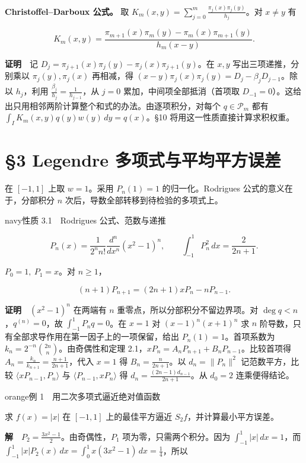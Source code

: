 \documentclass[11pt,a4paper]{article}
\newcommand{\lectureheading}[1]{\section{#1}}
\begin{document}
\textbf{Christoffel--Darboux 公式。} 取 \(K_m(x,y)=\sum_{j=0}^m\frac{\pi_j(x)\pi_j(y)}{h_j}\)。对 \(x\ne y\) 有

\[
K_m(x,y)=\frac{\pi_{m+1}(x)\pi_m(y)-\pi_m(x)\pi_{m+1}(y)}
{h_m(x-y)} .
\]

\textbf{证明}　记 \(D_j=\pi_{j+1}(x)\pi_j(y)-\pi_j(x)\pi_{j+1}(y)\)。在 \(x,y\) 写出三项递推，分别乘以 \(\pi_j(y),\pi_j(x)\) 再相减，得 \((x-y)\pi_j(x)\pi_j(y)=D_j-\beta_jD_{j-1}\)。除以 \(h_j\)，利用 \(\frac{\beta_j}{h_j}=\frac{1}{h_{j-1}}\)，从 \(j=0\) 累加，中间项全部抵消（首项取 \(D_{-1}=0\)）。这给出只用相邻两阶计算整个和式的办法。由逐项积分，对每个 \(q\in\mathcal P_m\) 都有 \(\int_I K_m(x,y)q(y)w(y)\,dy=q(x)\)。§10 将用这一性质直接计算求积权重。

\clearpage\lectureheading{§3 Legendre 多项式与平均平方误差}

在 \([-1,1]\) 上取 \(w=1\)。采用 \(P_n(1)=1\) 的归一化。Rodrigues 公式的意义在于，分部积分 \(n\) 次后，导数全部转移到待检验的多项式上。

\begin{sboxenv}{navy}{性质 3.1　Rodrigues 公式、范数与递推}

\[
P_n(x)=\frac{1}{2^n n!}\frac{d^n}{dx^n}(x^2-1)^n,\qquad
\int_{-1}^1 P_n^2\,dx=\frac{2}{2n+1}.
\]

\(P_0=1,\ P_1=x\)。对 \(n\ge1\)，

\[
(n+1)P_{n+1}=(2n+1)xP_n-nP_{n-1}.
\]

\end{sboxenv}

\textbf{证明}　\((x^2-1)^n\) 在两端有 \(n\) 重零点，所以分部积分不留边界项。对 \(\deg q<n\)，\(q^{(n)}=0\)，故 \(\int_{-1}^1 P_nq=0\)。在 \(x=1\) 对 \((x-1)^n(x+1)^n\) 求 \(n\) 阶导数，只有全部求导作用在第一因子上的一项保留，给出 \(P_n(1)=1\)。首项系数为 \(k_n=2^{-n}\binom{2n}{n}\)。由奇偶性和定理 2.1，\(xP_n=A_nP_{n+1}+B_nP_{n-1}\)。比较首项得 \(A_n=\frac{k_n}{k_{n+1}}=\frac{n+1}{2n+1}\)，代入 \(x=1\) 得 \(B_n=\frac{n}{2n+1}\)。以 \(d_n=\|P_n\|^2\) 记范数平方，比较 \(\langle xP_{n-1},P_n\rangle\) 与 \(\langle P_{n-1},xP_n\rangle\) 得 \(d_n=\frac{(2n-1)d_{n-1}}{2n+1}\)。从 \(d_0=2\) 连乘便得结论。

\begin{sboxenv}{orange}{例 1　用二次多项式逼近绝对值函数}

求 \(f(x)=|x|\) 在 \([-1,1]\) 上的最佳平方逼近 \(S_2 f\)，并计算最小平方误差。

\end{sboxenv}

\textbf{解}　\(P_2=\frac{3x^2-1}{2}\)。由奇偶性，\(P_1\) 项为零，只需两个积分。因为 \(\int_{-1}^1|x|\,dx=1\)，而 \(\int_{-1}^1|x|P_2(x)\,dx=\int_0^1 x(3x^2-1)\,dx=\frac{1}{4}\)，所以
\end{document}
